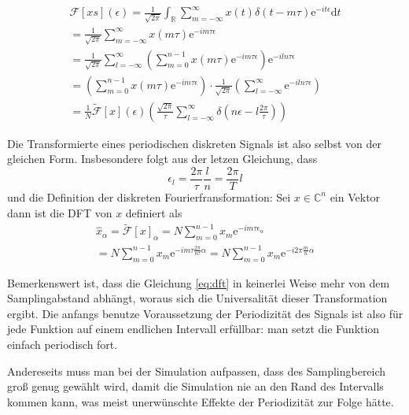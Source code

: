 \documentclass[10pt,a4paper,german]{scrartcl}
\begin{document}
		\begin{multline*}
			\mathcal{F}[x s](\epsilon)
				= \frac{1}{\sqrt{2 \pi}}\int_{\mathbb{R}}{
					 \sum_{m=-\infty}^{\infty} x(t)\delta(t-m\tau)
						 \mathrm{e}^{- i t \epsilon}
					 \mathrm{d}t }\\
				= \frac{1}{\sqrt{2 \pi}}
				  \sum_{m=-\infty}^{\infty} x(m\tau) \mathrm{e}^{- i m \tau \epsilon} \\
  			= \frac{1}{\sqrt{2 \pi}} \sum_{l=-\infty}^{\infty}
					 \left(\sum_{m=0}^{n-1} x(m\tau) \mathrm{e}^{- i m \tau \epsilon}\right)
					  \mathrm{e}^{- i l n \tau \epsilon}\\
				= \left(\sum_{m=0}^{n-1} x(m\tau) \mathrm{e}^{- i m \tau \epsilon}\right)
				  \cdot \frac{1}{\sqrt{2 \pi}}
				  \left( \sum_{l=-\infty}^{\infty} \mathrm{e}^{- i l n \tau \epsilon} \right) \\
				= \frac{1}{N} \tilde{\mathcal{F}}[x](\epsilon)
					\left(\frac{\sqrt{2\pi}}{\tau}
				  	\sum_{l=-\infty}^{\infty} \delta\left(
				  	  n \epsilon - l \frac{2\pi}{\tau}
				  	\right)
				  \right)
		\end{multline*}

		Die Transformierte eines periodischen diskreten Signals ist also selbst
		von der gleichen Form. Insbesondere folgt aus der letzen Gleichung, dass
		\begin{equation}
			\epsilon_l = \frac{2\pi}{\tau}\frac{l}{n} = \frac{2\pi}{T} l
		\end{equation}
		und die Definition der diskreten Fourierfransformation:
		Sei $x \in \mathbb{C}^n$ ein Vektor dann ist die DFT von $x$ definiert
		als
		\begin{multline}
		\label{eq:dft}
			\hat{x}_\alpha
			= \tilde{\mathcal{F}}[x]_\alpha
			= N \sum_{m=0}^{n-1} x_m \mathrm{e}^{- i m \tau \epsilon_\alpha}\\
			= N \sum_{m=0}^{n-1} x_m \mathrm{e}^{- i m \tau  \frac{2\pi}{n\tau} \alpha}
			= N \sum_{m=0}^{n-1} x_m \mathrm{e}^{- i 2\pi \frac{m}{n} \alpha}
		\end{multline}

		Bemerkenswert ist, dass die Gleichung \eqref{eq:dft} in keinerlei Weise
		mehr von dem Samplingabstand abhängt, woraus sich die Universalität
		dieser Transformation ergibt. Die anfangs benutze Voraussetzung der
		Periodizität des Signals ist also für jede Funktion auf einem endlichen
		Intervall erfüllbar: man setzt die Funktion einfach periodisch fort.

		Andereseits muss man bei der Simulation aufpassen, dass des Samplingbereich
		groß genug gewählt wird, damit die Simulation nie an den Rand des Intervalls
		kommen kann, was meist unerwünschte Effekte der Periodizität zur Folge hätte.
\end{document}
